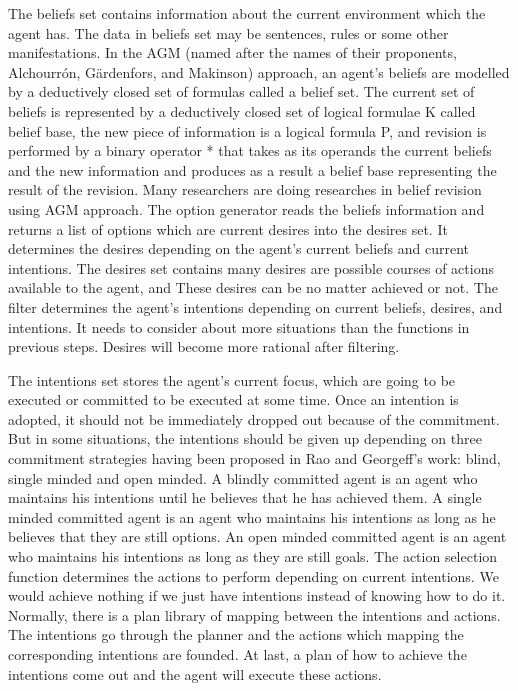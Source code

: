The beliefs set contains information about the current environment which the agent has. The data in beliefs set may be sentences, rules or some other manifestations. In the AGM (named after the names of their proponents, Alchourrón, Gärdenfors, and Makinson) approach, an agent’s beliefs are modelled by a deductively closed set of formulas called a belief set\cite{James_revise_2011}. %
The current set of beliefs is represented by a deductively closed set of logical formulae K called belief base, the new piece of information is a logical formula P, and revision is performed by a binary operator * that takes as its operands the current beliefs and the new information and produces as a result a belief base representing the result of the revision\cite{M_Belief}. Many researchers are doing researches in belief revision using AGM approach.
The option generator reads the beliefs information and returns a list of options which are current desires into the desires set. It determines the desires depending on the agent’s current beliefs and current intentions. The desires set contains many desires are possible courses of actions available to the agent, and These desires can be no matter achieved or not. The filter determines the agent’s intentions depending on current beliefs, desires, and intentions. It needs to consider about more situations than the functions in previous steps. Desires will become more rational after filtering.

The intentions set stores the agent’s current focus, which are going to be executed or committed to be executed at some time. Once an intention is adopted, it should not be immediately dropped out because of the commitment. But in some situations, the intentions should be given up depending on  three commitment strategies having been proposed in Rao and Georgeff’s work:  blind, single minded and open minded. A blindly committed agent is an agent who maintains his intentions until he believes that he has achieved them. A single minded committed agent is an agent who maintains his intentions as long as he believes that they are still options. An open minded committed agent is an agent who maintains his intentions as long as they are still goals\cite{Roberto_BDIATL_2005}. The action selection function determines the actions to perform depending on current intentions. We would achieve nothing if we just have intentions instead of knowing how to do it. Normally, there is a plan library of mapping between the intentions and actions. The intentions go through the planner and the actions which mapping the corresponding intentions are founded. At last, a plan of how to achieve the intentions come out and the agent will execute these actions.

